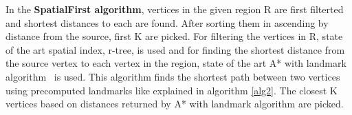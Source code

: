 In the \textbf{SpatialFirst algorithm}, vertices in the given region R are first filterted and shortest distances to each are found. After sorting them in ascending by distance from the source, first K are picked. For filtering the vertices in R, state of the art spatial index, r-tree, is used and for finding the shortest distance from the source vertex to each vertex in the region, state of the art A* with landmark algorithm~\cite{AC2005} is used. This algorithm finds the shortest path between two vertices using precomputed landmarks like explained in algorithm \ref{alg2}. The closest K vertices based on distances returned by A* with landmark algorithm are picked. 




